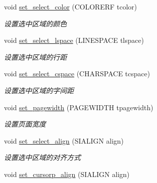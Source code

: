 \begin{DoxyCompactItemize}
void \hyperlink{class_s_i_t_e_x_t_abfd80c912a40b72c0cb113ad147b3d33}{set\+\_\+select\+\_\+color} (C\+O\+L\+O\+R\+E\+RF tcolor)
\begin{DoxyCompactList}\small\item\em 设置选中区域的颜色 \end{DoxyCompactList}\item 
\mbox{\label{class_s_i_t_e_x_t_af79cfc54434033545610de0dc0580fa9}} 
void \hyperlink{class_s_i_t_e_x_t_af79cfc54434033545610de0dc0580fa9}{set\+\_\+select\+\_\+lspace} (L\+I\+N\+E\+S\+P\+A\+CE tlspace)
\begin{DoxyCompactList}\small\item\em 设置选中区域的行距 \end{DoxyCompactList}\item 
\mbox{\label{class_s_i_t_e_x_t_a4fde9667222b3289a6c98da2871661af}} 
void \hyperlink{class_s_i_t_e_x_t_a4fde9667222b3289a6c98da2871661af}{set\+\_\+select\+\_\+cspace} (C\+H\+A\+R\+S\+P\+A\+CE tcspace)
\begin{DoxyCompactList}\small\item\em 设置选中区域的字间距 \end{DoxyCompactList}\item 
\mbox{\label{class_s_i_t_e_x_t_a324e28153c8ebfeb4cabc3b82171c5e5}} 
void \hyperlink{class_s_i_t_e_x_t_a324e28153c8ebfeb4cabc3b82171c5e5}{set\+\_\+pagewidth} (P\+A\+G\+E\+W\+I\+D\+TH tpagewidth)
\begin{DoxyCompactList}\small\item\em 设置页面宽度 \end{DoxyCompactList}\item 
\mbox{\label{class_s_i_t_e_x_t_ad37947fae9aa012847b5b32c73d32af7}} 
void \hyperlink{class_s_i_t_e_x_t_ad37947fae9aa012847b5b32c73d32af7}{set\+\_\+select\+\_\+align} (S\+I\+A\+L\+I\+GN align)
\begin{DoxyCompactList}\small\item\em 设置选中区域的对齐方式 \end{DoxyCompactList}\item 
\mbox{\label{class_s_i_t_e_x_t_a1717bc1a3f8d797fc52654ffb7aafb87}} 
void \hyperlink{class_s_i_t_e_x_t_a1717bc1a3f8d797fc52654ffb7aafb87}{set\+\_\+cursorp\+\_\+align} (S\+I\+A\+L\+I\+GN align)

\end{DoxyCompactItemize}
